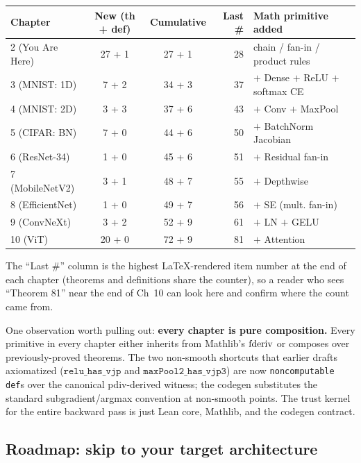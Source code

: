 \begin{center}
\begin{tabular}{l c c r l}
\hline
Chapter & New (th + def) & Cumulative & Last \# & Math primitive added \\
\hline
2 (You Are Here)       & 27 + 1  & 27 + 1 & 28 & chain / fan-in / product rules \\
3 (MNIST: 1D)          & 7 + 2   & 34 + 3 & 37 & $+$ Dense $+$ ReLU $+$ softmax CE \\
4 (MNIST: 2D)          & 3 + 3   & 37 + 6 & 43 & $+$ Conv $+$ MaxPool \\
5 (CIFAR: BN)          & 7 + 0   & 44 + 6 & 50 & $+$ BatchNorm Jacobian \\
6 (ResNet-34)          & 1 + 0   & 45 + 6 & 51 & $+$ Residual fan-in \\
7 (MobileNetV2)        & 3 + 1   & 48 + 7 & 55 & $+$ Depthwise \\
8 (EfficientNet)       & 1 + 0   & 49 + 7 & 56 & $+$ SE (mult. fan-in) \\
9 (ConvNeXt)           & 3 + 2   & 52 + 9 & 61 & $+$ LN $+$ GELU \\
10 (ViT)               & 20 + 0  & 72 + 9 & 81 & $+$ Attention \\
\hline
\end{tabular}
\end{center}

The ``Last \#'' column is the highest LaTeX-rendered item number at
the end of each chapter (theorems and definitions share the
counter), so a reader who sees ``Theorem 81'' near the end of Ch~10
can look here and confirm where the count came from.

One observation worth pulling out: \textbf{every chapter is pure
composition.} Every primitive in every chapter either inherits
from Mathlib's \(\operatorname{fderiv}\) or composes over previously-proved
theorems. The two non-smooth shortcuts that earlier drafts axiomatized
(\(\texttt{relu\_has\_vjp}\) and \(\texttt{maxPool2\_has\_vjp3}\))
are now \texttt{noncomputable def}s over the canonical
pdiv-derived witness; the codegen substitutes the standard
subgradient/argmax convention at non-smooth points. The trust
kernel for the entire backward pass is just Lean core, Mathlib,
and the codegen contract.

\subsection*{Roadmap: skip to your target architecture}

